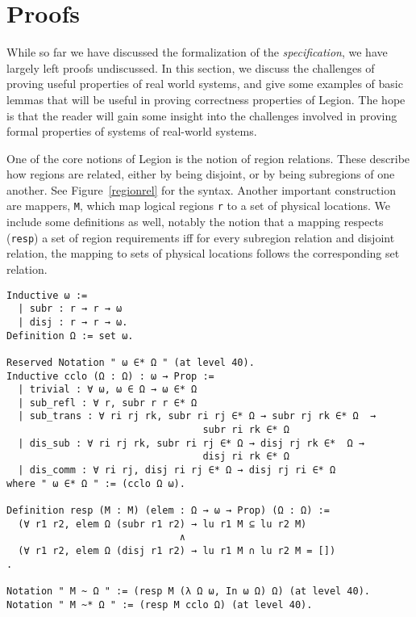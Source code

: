 \documentclass[sigconf]{acmart}
\begin{document}
\section{Proofs}

While so far we have discussed the formalization of the \emph{specification},
we have largely left proofs undiscussed. In this section, we
discuss the challenges of proving useful properties of real world systems, and
give some examples of basic lemmas that will be useful in proving correctness
properties of Legion. The hope is that the reader will gain some insight into
the challenges involved in proving formal properties of systems of real-world
systems.

One of the core notions of Legion is the notion of region relations. These
describe how regions are related, either by being disjoint, or by being
subregions of one another. See Figure~\ref{regionrel} for the syntax. Another
important construction are mappers, \texttt{M}, which map logical regions
\texttt{r} to a set of physical locations. We include some definitions as
well, notably the notion that a mapping respects (\texttt{resp}) a set of
region requirements iff for every subregion relation and disjoint relation, the
mapping to sets of physical locations follows the corresponding set relation.

\begin{figure*}
\centering
\begin{BVerbatim}
Inductive ω := 
  | subr : r → r → ω 
  | disj : r → r → ω.
Definition Ω := set ω.

Reserved Notation " ω ∈* Ω " (at level 40).
Inductive cclo (Ω : Ω) : ω → Prop := 
  | trivial : ∀ ω, ω ∈ Ω → ω ∈* Ω
  | sub_refl : ∀ r, subr r r ∈* Ω
  | sub_trans : ∀ ri rj rk, subr ri rj ∈* Ω → subr rj rk ∈* Ω  → 
                                  subr ri rk ∈* Ω 
  | dis_sub : ∀ ri rj rk, subr ri rj ∈* Ω → disj rj rk ∈*  Ω → 
                                  disj ri rk ∈* Ω
  | dis_comm : ∀ ri rj, disj ri rj ∈* Ω → disj rj ri ∈* Ω 
where " ω ∈* Ω " := (cclo Ω ω).

Definition resp (M : M) (elem : Ω → ω → Prop) (Ω : Ω) :=
  (∀ r1 r2, elem Ω (subr r1 r2) → lu r1 M ⊆ lu r2 M)
                              ∧ 
  (∀ r1 r2, elem Ω (disj r1 r2) → lu r1 M ∩ lu r2 M = [])
.

Notation " M ~ Ω " := (resp M (λ Ω ω, In ω Ω) Ω) (at level 40).
Notation " M ~* Ω " := (resp M cclo Ω) (at level 40).
\end{BVerbatim}
\caption{Syntax for region relations}
\label{regionrel}
\end{figure*}
\end{document}
